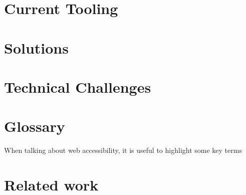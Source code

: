 \documentclass{article}
\begin{document}

\section{Current Tooling}


\section{Solutions}


\section{Technical Challenges}


\section{Glossary}

When talking about web accessibility, it is useful to highlight some key terms


\section{Related work}



\newpage

\printbibliography
\end{document}
